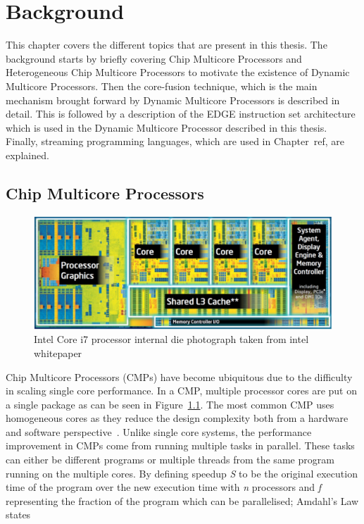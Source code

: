 \chapter{Background}
This chapter covers the different topics that are present in this thesis.
The background starts by briefly covering Chip Multicore Processors and Heterogeneous Chip Multicore Processors to motivate the existence of Dynamic Multicore Processors.
Then the core-fusion technique, which is the main mechanism brought forward by Dynamic Multicore Processors is described in detail.
This is followed by a description of the EDGE instruction set architecture which is used in the Dynamic Multicore Processor described in this thesis.
Finally, streaming programming languages, which are used in Chapter~ref{}, are explained.

\section{Chip Multicore Processors}

\begin{figure}[t]
 \center
 \includegraphics[width=1\textwidth]{background/graphics/i7intel.jpg}
 \caption{Intel Core i7 processor internal die photograph taken from intel whitepaper}\label{fig:i7}
\end{figure}
 
Chip Multicore Processors (CMPs) have become ubiquitous due to the difficulty in scaling single core performance.
In a CMP, multiple processor cores are put on a single package as can be seen in Figure~\ref{fig:i7}.
The most common CMP uses homogeneous cores as they reduce the design complexity both from a hardware and software perspective~\cite{}.
Unlike single core systems, the performance improvement in CMPs come from running multiple tasks in parallel.
These tasks can either be different programs or multiple threads from the same program running on the multiple cores.
By defining speedup \textit{S} to be the original execution time of the program over the new execution time with \textit{n} processors and \textit{f} representing the fraction of the program which can be parallelised; Amdahl's Law states

